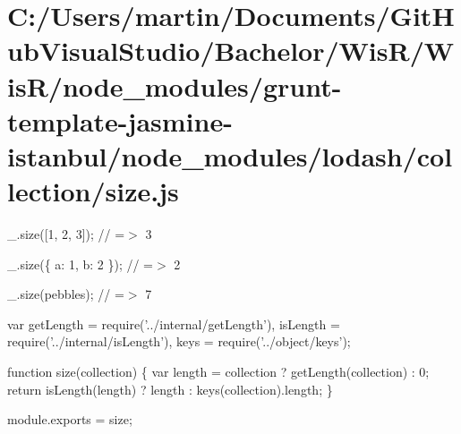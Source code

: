 \hypertarget{_c_1_2_users_2martin_2_documents_2_git_hub_visual_studio_2_bachelor_2_wis_r_2_wis_r_2node_moduleed708995e0a1fa347055d2e9540bc903}{}\section{C\+:/\+Users/martin/\+Documents/\+Git\+Hub\+Visual\+Studio/\+Bachelor/\+Wis\+R/\+Wis\+R/node\+\_\+modules/grunt-\/template-\/jasmine-\/istanbul/node\+\_\+modules/lodash/collection/size.\+js}
\+\_\+.\+size(\mbox{[}1, 2, 3\mbox{]}); // =$>$ 3

\+\_\+.\+size(\{ \textquotesingle{}a\textquotesingle{}\+: 1, \textquotesingle{}b\textquotesingle{}\+: 2 \}); // =$>$ 2

\+\_\+.\+size(\textquotesingle{}pebbles\textquotesingle{}); // =$>$ 7


\begin{DoxyCodeInclude}
var getLength = require(\textcolor{stringliteral}{'../internal/getLength'}),
    isLength = require(\textcolor{stringliteral}{'../internal/isLength'}),
    keys = require(\textcolor{stringliteral}{'../object/keys'});

\textcolor{keyword}{function} size(collection) \{
  var length = collection ? getLength(collection) : 0;
  \textcolor{keywordflow}{return} isLength(length) ? length : keys(collection).length;
\}

module.exports = size;
\end{DoxyCodeInclude}
 